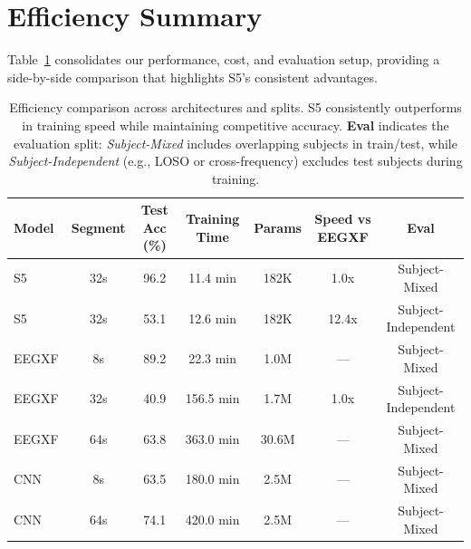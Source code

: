 \documentclass{article}
\newcommand{\eegtrans}{EEGXF}
\begin{document}
\section{Efficiency Summary}

Table~\ref{tab:efficiency_summary} consolidates our performance, cost, and evaluation setup, providing a side-by-side comparison that highlights S5’s consistent advantages.

\begin{table}[h]
\centering
\caption{Efficiency comparison across architectures and splits. S5 consistently outperforms in training speed while maintaining competitive accuracy. \textbf{Eval} indicates the evaluation split: \textit{Subject-Mixed} includes overlapping subjects in train/test, while \textit{Subject-Independent} (e.g., LOSO or cross-frequency) excludes test subjects during training.}
\label{tab:efficiency_summary}
\begin{tabular}{lcccccc}
\toprule
Model & Segment & Test Acc (\%) & Training Time & Params & Speed vs \eegtrans & Eval \\
\midrule
S5 & 32s & 96.2 & 11.4 min & 182K & 1.0x & Subject-Mixed \\
S5 & 32s & 53.1 & 12.6 min & 182K & 12.4x & Subject-Independent \\
\eegtrans & 8s & 89.2 & 22.3 min & 1.0M & — & Subject-Mixed \\
\eegtrans & 32s & 40.9 & 156.5 min & 1.7M & 1.0x & Subject-Independent \\
\eegtrans & 64s & 63.8 & 363.0 min & 30.6M & — & Subject-Mixed \\
CNN & 8s & 63.5 & 180.0 min & 2.5M & — & Subject-Mixed \\
CNN & 64s & 74.1 & 420.0 min & 2.5M & — & Subject-Mixed \\
\bottomrule
\end{tabular}
\end{table}




\end{document}
